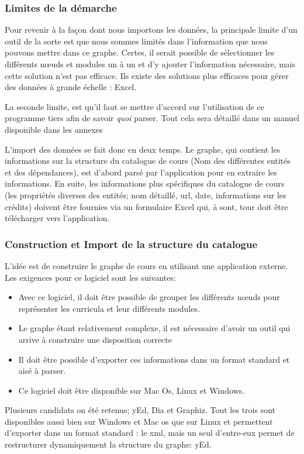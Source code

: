 \subsubsection{Limites de la démarche}
Pour revenir à la façon dont nous importons les données, la principale limite d'un outil de la sorte est que nous sommes limités dans l'information que nous pouvons mettre dans ce graphe. Certes, il serait possible de sélectionner les différents nœuds et modules un à un et d'y ajouter l'information nécessaire, mais cette solution n'est pas efficace. Ils existe des solutions plus efficaces pour gérer des données à grande échelle : Excel.

La seconde limite, est qu'il faut se mettre d'accord sur l'utilisation de ce programme tiers afin de savoir \textit{quoi} parser. Tout cela sera détaillé dans un manuel disponible dans les annexes

L'import des données se fait donc en deux temps. Le graphe, qui contient les informations sur la structure du catalogue de cours (Nom des différentes entités et des dépendances), est d'abord parsé par l'application pour en extraire les informations. En suite, les informations plus spécifiques du catalogue de cours (les propriétés diverses des entités; nom détaillé, url, date, informations sur les crédits) doivent être fournies via un formulaire Excel qui, à sont, tour doit être télécharger vers l'application.

\subsubsection{Construction et Import de la structure du catalogue}
L'idée est de construire le graphe de cours en utilisant une application externe. Les exigences pour ce logiciel sont les suivantes:
\begin{itemize}
\item  Avec ce logiciel, il doit être possible de grouper les différents nœuds pour représenter les curricula et leur différents modules.
\item Le graphe étant relativement complexe, il est nécessaire d'avoir un outil qui arrive à construire une disposition correcte
\item Il doit être possible d'exporter ces informations dans un format standard et aisé à parser. 
\item Ce logiciel doit être disponible sur Mac Os, Linux et Windows. 
\end{itemize}

Plusieurs candidats on été retenus; yEd, Dia et Graphiz. Tout les trois sont disponibles aussi bien sur Windows et Mac os que sur Linux et permettent d'exporter dans un format standard : le xml, mais un seul d'entre-eux permet de restructurer dynamiquement la structure du graphe: yEd.

